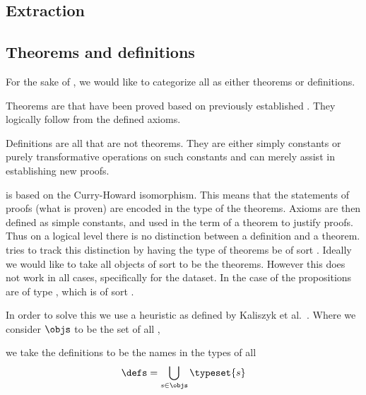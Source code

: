 \subsection{Extraction}
\label{section:extraction}


\subsection{Theorems and definitions}
\label{section:thmsdefs}

For the sake of \premiseselection, we would like to categorize all \coqobjs as either theorems or definitions.
\begin{definition}[theorem]
    Theorems are \coqobjs that have been proved based on previously established \coqobjs.
    They logically follow from the defined axioms.
\end{definition}

\begin{definition}[definition]
    Definitions are all \coqobjs that are not theorems.
    They are either simply constants or purely transformative operations on such constants
    and can merely assist in establishing new proofs.
\end{definition}

\coq is based on the Curry-Howard isomorphism.
This means that the statements of proofs (what is proven) are encoded in the type of the theorems.
Axioms are then defined as simple constants, and used in the term of a theorem to justify proofs.
Thus on a logical level there is no distinction between a definition and a theorem.
\coq tries to track this distinction by having the type of theorems be of sort \sortprop.
Ideally we would like to take all objects of sort \sortprop to be the theorems.
However this does not work in all cases, specifically for the \corn dataset.
In the case of \corn the propositions are of type \cprop, which is of sort \sorttype.

In order to solve this we use a heuristic as defined by Kaliszyk et al.\ \cite{kaliszyk2014machine}.
Where we consider $\objs$ to be the set of all \coqobjs,

\begin{definition}\label{def:defs}
  we take the definitions to be the names in the types of all \coqobjs
  \[ \defs = \bigcup_{s \in \objs} \typeset{s} \]
\end{definition}

